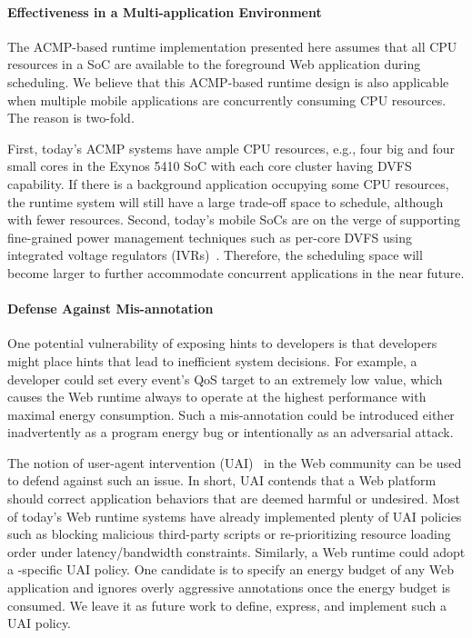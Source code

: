 \paragraph{Effectiveness in a Multi-application Environment} The ACMP-based \greenweb runtime implementation presented here assumes that all CPU resources in a SoC are available to the foreground Web application during scheduling. We believe that this ACMP-based runtime design is also applicable when multiple mobile applications are concurrently consuming CPU resources. The reason is two-fold.

First, today's ACMP systems have ample CPU resources, e.g., four big and four small cores in the Exynos 5410 SoC with each core cluster having DVFS capability. If there is a background application occupying some CPU resources, the \greenweb runtime system will still have a large trade-off space to schedule, although with fewer resources. Second, today's mobile SoCs are on the verge of supporting fine-grained power management techniques such as per-core DVFS using integrated voltage regulators (IVRs)~\cite{ivr}. Therefore, the scheduling space will become larger to further accommodate concurrent applications in the near future.

\paragraph{Defense Against Mis-annotation} One potential vulnerability of exposing \greenweb hints to developers is that developers might place hints that lead to inefficient system decisions. For example, a developer could set every event's QoS target to an extremely low value, which causes the Web runtime always to operate at the highest performance with maximal energy consumption. Such a mis-annotation could be introduced either inadvertently as a program energy bug or intentionally as an adversarial attack.

The notion of user-agent intervention (UAI)~\cite{useragentintervention} in the Web community can be used to defend against such an issue. In short, UAI contends that a Web platform should correct application behaviors that are deemed harmful or undesired. Most of today's Web runtime systems have already implemented plenty of UAI policies such as blocking malicious third-party scripts or re-prioritizing resource loading order under latency/bandwidth constraints. Similarly, a Web runtime could adopt a \greenweb-specific UAI policy. One candidate is to specify an energy budget of any Web application and ignores overly aggressive \greenweb annotations once the energy budget is consumed. We leave it as future work to define, express, and implement such a UAI policy.


